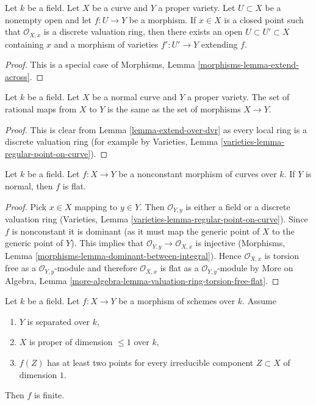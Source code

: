 \begin{lemma}
\label{lemma-extend-over-dvr}
Let $k$ be a field. Let $X$ be a curve and $Y$ a proper variety.
Let $U \subset X$ be a nonempty open and let $f : U \to Y$ be a morphism.
If $x \in X$ is a closed point such that $\mathcal{O}_{X, x}$
is a discrete valuation ring, then there exists an open
$U \subset U' \subset X$ containing $x$ and a morphism of
varieties $f' : U' \to Y$ extending $f$.
\end{lemma}

\begin{proof}
This is a special case of
Morphisms, Lemma \ref{morphisms-lemma-extend-across}.
\end{proof}

\begin{lemma}
\label{lemma-extend-over-normal-curve}
Let $k$ be a field. Let $X$ be a normal curve and $Y$ a proper variety.
The set of rational maps from $X$ to $Y$ is the same as the set
of morphisms $X \to Y$.
\end{lemma}

\begin{proof}
This is clear from Lemma \ref{lemma-extend-over-dvr}
as every local ring is a discrete valuation ring
(for example by Varieties, Lemma \ref{varieties-lemma-regular-point-on-curve}).
\end{proof}

\begin{lemma}
\label{lemma-flat}
Let $k$ be a field. Let $f : X \to Y$ be a nonconstant morphism
of curves over $k$. If $Y$ is normal, then $f$ is flat.
\end{lemma}

\begin{proof}
Pick $x \in X$ mapping to $y \in Y$. Then $\mathcal{O}_{Y, y}$ is either a
field or a discrete valuation ring
(Varieties, Lemma \ref{varieties-lemma-regular-point-on-curve}).
Since $f$ is nonconstant it is dominant (as it must map the
generic point of $X$ to the generic point of $Y$). This implies that
$\mathcal{O}_{Y, y} \to \mathcal{O}_{X, x}$ is injective
(Morphisms, Lemma \ref{morphisms-lemma-dominant-between-integral}).
Hence $\mathcal{O}_{X, x}$ is torsion free as a $\mathcal{O}_{Y, y}$-module
and therefore $\mathcal{O}_{X, x}$ is flat as a $\mathcal{O}_{Y, y}$-module
by More on Algebra, Lemma
\ref{more-algebra-lemma-valuation-ring-torsion-free-flat}.
\end{proof}

\begin{lemma}
\label{lemma-finite}
Let $k$ be a field. Let $f : X \to Y$ be a morphism of
schemes over $k$. Assume
\begin{enumerate}
\item $Y$ is separated over $k$,
\item $X$ is proper of dimension $\leq 1$ over $k$,
\item $f(Z)$ has at least two points for every irreducible
component $Z \subset X$ of dimension $1$.
\end{enumerate}
Then $f$ is finite.
\end{lemma}

